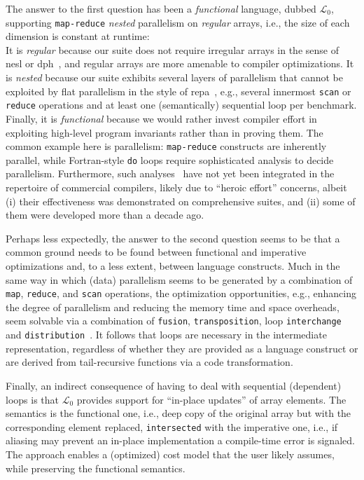 \documentclass{sigplanconf}  %
\newcommand{\LO}{$\mathcal{L}_0$}
\begin{document}
The answer to the first question has been %
a {\em functional} language, dubbed \LO{}, supporting %
\texttt{map-reduce} {\em nested} parallelism on {\em regular} arrays, i.e., 
the size of each dimension is constant at runtime:\\
It is {\em regular} because our suite does not require irregular 
arrays in the sense of {\sc nesl} or {\sc dph}~\cite{BlellochCACM96NESL,Chak06DPH}, 
and regular arrays are more amenable to compiler optimizations.
%
It is {\em nested} because our suite exhibits several layers of 
parallelism that cannot be exploited by flat parallelism in the style of 
{\sc repa}~\cite{REPA}, e.g., several innermost {\tt scan} or 
{\tt reduce} operations and at least one (semantically)
sequential loop per benchmark.
%
Finally, it is {\em functional} because we would rather invest compiler effort
in exploiting high-level program invariants rather than in proving them.
The common example here is parallelism: {\tt map-reduce} 
constructs are inherently parallel, while Fortran-style \texttt{do} 
loops require sophisticated analysis to decide parallelism. 
Furthermore, such analyses~\cite{Blume94RangeTest,SUIF,CosPLDI} %
have not yet been integrated in the repertoire of commercial compilers,
likely due to ``heroic effort'' concerns, albeit
 (i) their effectiveness was demonstrated on comprehensive suites, and
(ii) some of them were developed more than a decade ago.

Perhaps less expectedly, the answer to the second question seems to be 
that a common ground needs to be found between functional and imperative
optimizations and, to a less extent,  between language constructs.
Much in the same way in which (data) parallelism seems to be generated by
a combination of {\tt map}, {\tt reduce}, and {\tt scan} operations, 
the optimization opportunities, e.g., enhancing the degree of parallelism 
and reducing  the memory time and space overheads, seem solvable via a 
combination of {\tt fusion}, {\tt transposition}, loop {\tt interchange} 
and {\tt distribution}~\cite{OptCompModernArch}.
%
It follows that loops are necessary in the intermediate representation,
regardless of whether they are provided as a language construct or are
derived from tail-recursive functions via a code transformation. 

Finally, an indirect consequence of having to deal with sequential (dependent) 
loops is that \LO{} provides support for ``in-place updates'' of 
array elements. The semantics is the functional one, i.e., %
deep copy of the original array but with the corresponding element replaced,
\texttt{intersected} with the imperative one, i.e., if aliasing may prevent 
an in-place implementation a compile-time error is signaled.   The approach
enables a (optimized) cost model that the user likely assumes, while 
preserving the functional semantics. 
\end{document}
